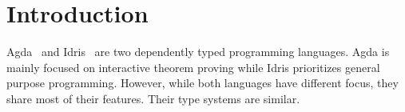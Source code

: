 \documentclass[parskip=half]{scrartcl}
\begin{document}





%


%
%
%



\section{Introduction}

Agda~\cite{agda} and Idris~\cite{idris} are two dependently typed programming
languages.  Agda is mainly focused on interactive theorem proving while Idris
prioritizes general purpose programming.  However, while both languages have
different focus, they share most of their features. Their type systems are
similar.
\end{document}
